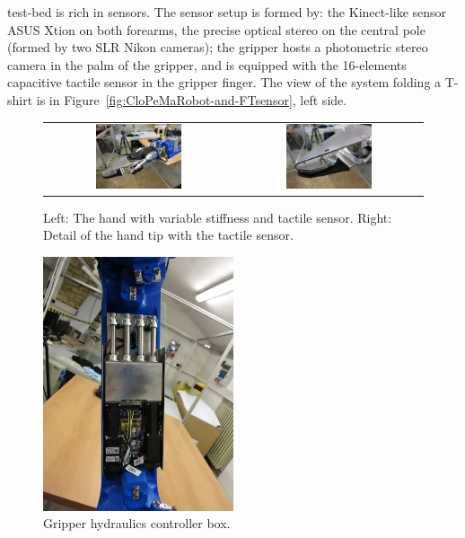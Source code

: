         \CloPeMa\/ test-bed is rich in sensors. The sensor setup is formed by: the Kinect-like sensor ASUS Xtion on both forearms, the precise optical stereo on the central pole (formed by two SLR Nikon cameras); the gripper hosts a photometric stereo camera in the palm of the gripper, and is equipped with the 16-elements capacitive tactile sensor in the gripper finger. The view of the \CloPeMa\/ system folding a T-shirt is in Figure~\ref{fig:CloPeMaRobot-and-FTsensor}, left side.

        \begin{figure}[h]
        \centering
        \begin{tabular}{cc}
        \includegraphics[width=0.48\textwidth]{CloPeMaGripperEntireView1Sm}
        &
        \includegraphics[width=0.48\textwidth]{CloPeMaGripperTactileSensorSm}
        \end{tabular}
        \caption{Left: The \CloPeMa\/ hand with variable stiffness and tactile sensor. Right: Detail of the hand tip with the tactile sensor.}
        \label{fig:CloPeMaHand}
        \end{figure}

        \begin{figure}[h]
        \centering
        \includegraphics[width=0.5\textwidth]{CloPeMaGripperHydraulicsSm}
        \caption{Gripper hydraulics controller box.}
        \label{fig:CloPeMaHandHydraulics}
        \end{figure}

